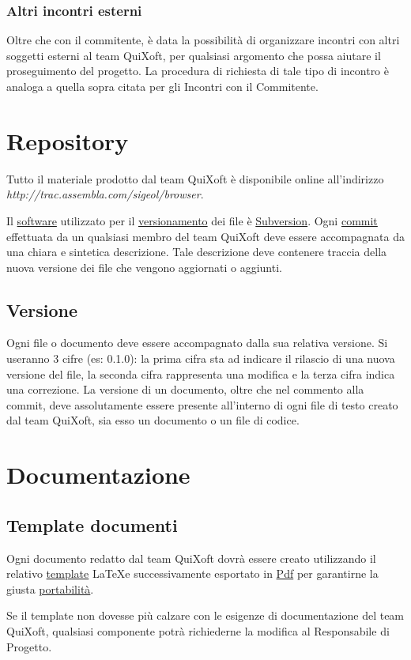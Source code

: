 \documentclass[11pt,a4paper]{article}
\begin{document}
\subsubsection{Altri incontri esterni}
Oltre che con il commitente, è data la possibilità di organizzare incontri con altri soggetti esterni al team QuiXoft, per qualsiasi argomento che possa aiutare il proseguimento del progetto.
La procedura di richiesta di tale tipo di incontro è analoga a quella sopra citata per gli Incontri con il Commitente.
\section{Repository}
Tutto il materiale prodotto dal team QuiXoft è disponibile online all'indirizzo \textit{http://trac.assembla.com/sigeol/browser}.

Il \underline{software} utilizzato per il \underline{versionamento} dei file è \underline{Subversion}.
O\-gni \underline{commit} effettuata da un qualsiasi membro del team QuiXoft deve essere accompagnata da una chiara e sintetica descrizione. Tale descrizione deve contenere traccia della nuova versione dei file che vengono aggiornati o aggiunti.
\subsection{Versione}
Ogni file o documento deve essere accompagnato dalla sua relativa versione. Si useranno 3 cifre (es: 0.1.0): la prima cifra sta ad indicare il rilascio di una nuova versione del file, la seconda cifra rappresenta una modifica e la terza cifra indica una correzione. La versione di un documento, oltre che nel commento alla commit, deve assolutamente essere presente all'interno di ogni file di testo creato dal team QuiXoft, sia esso un documento o un file di codice.
\section{Documentazione}
\subsection{Template documenti}
Ogni documento redatto dal team QuiXoft dovrà essere creato utilizzando il relativo \underline{template} \LaTeX \space e successivamente esportato in \underline{Pdf} per garantirne la giusta \underline{portabilità}.

Se il template non dovesse più calzare con le esigenze di documentazione del team QuiXoft, qualsiasi componente potrà richiederne la modifica al Responsabile di Progetto.
\end{document}
